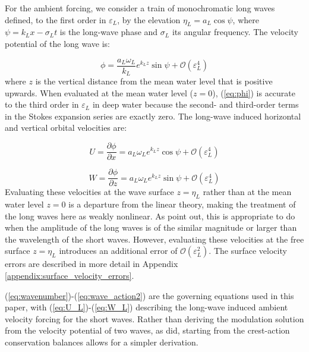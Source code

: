 \documentclass[lineno]{jfm}
\begin{document}
For the ambient forcing, we consider a train of monochromatic long waves
defined, to the first order in $\varepsilon_L$, by the elevation
$\eta_L = a_L \cos{\psi}$, where $\psi = k_L x - \sigma_L t$ is the long-wave
phase and $\sigma_L$ its angular frequency.
The velocity potential of the long wave is:

\begin{equation}
\label{eq:phi}
\phi = \dfrac{a_L \omega_L}{k_L} e^{k_L z} \sin{\psi} + \mathcal{O}(\varepsilon_L^4)
\end{equation}
where $z$ is the vertical distance from the mean water level that is positive
upwards.
When evaluated at the mean water level ($z=0$), (\ref{eq:phi}) is accurate to
the third order in $\varepsilon_L$ in deep water because the second- and
third-order terms in the Stokes expansion series are exactly zero.
The long-wave induced horizontal and vertical orbital velocities are:

\begin{equation}
\label{eq:U_L}
U =
\frac{\partial \phi}{\partial x} =
a_L \omega_L e^{k_L z} \cos{\psi} + \mathcal{O}(\varepsilon_L^4)
\end{equation}

\begin{equation}
\label{eq:W_L}
W =
\frac{\partial \phi}{\partial z} =
a_L \omega_L e^{k_L z} \sin{\psi} + \mathcal{O}(\varepsilon_L^4)
\end{equation}
Evaluating these velocities at the wave surface $z = \eta_L$ rather than at
the mean water level $z=0$ is a departure from the linear theory, making the
treatment of the long waves here as weakly nonlinear.
As \citet{zhang1990evolution} point out, this is appropriate to do when the
amplitude of the long waves is of the similar magnitude or larger than the
wavelength of the short waves.
However, evaluating these velocities at the free surface $z = \eta_L$ introduces
an additional error of $\mathcal{O}(\varepsilon_L^2)$.
The surface velocity errors are described in more detail in Appendix
\ref{appendix:surface_velocity_errors}.

(\ref{eq:wavenumber})-(\ref{eq:wave_action2}) are the governing equations used
in this paper, with (\ref{eq:U_L})-(\ref{eq:W_L}) describing the long-wave
induced ambient velocity forcing for the short waves. 
Rather than deriving the modulation solution from the velocity
potential of two waves, as \citet{longuet1960changes} did, starting from the
crest-action conservation balances allows for a simpler derivation.
\end{document}
